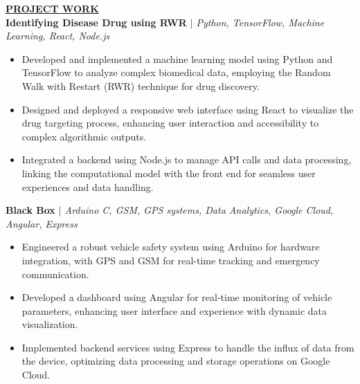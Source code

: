 \documentclass{article}
\begin{document}
\vspace{2mm} 
\noindent \textbf{\underline{PROJECT WORK}}\\
\noindent \textbf{Identifying Disease Drug using RWR} \textit{$\mid$ Python, TensorFlow, Machine Learning, React, Node.js} \hfill \textbf{}
\begin{itemize}[noitemsep,nolistsep,leftmargin=*]
\item {\small Developed and implemented a machine learning model using Python and TensorFlow to analyze complex biomedical data, employing the Random Walk with Restart (RWR) technique for drug discovery.}
\item {\small Designed and deployed a responsive web interface using React to visualize the drug targeting process, enhancing user interaction and accessibility to complex algorithmic outputs.}
\item {\small Integrated a backend using Node.js to manage API calls and data processing, linking the computational model with the front end for seamless user experiences and data handling.}
\end{itemize}

\noindent \textbf{Black Box} \textit{$\mid$ Arduino C, GSM, GPS systems, Data Analytics, Google Cloud, Angular, Express} \hfill \textbf{}
\begin{itemize}[noitemsep,nolistsep,leftmargin=*]
\item {\small Engineered a robust vehicle safety system using Arduino for hardware integration, with GPS and GSM for real-time tracking and emergency communication.}
\item {\small Developed a dashboard using Angular for real-time monitoring of vehicle parameters, enhancing user interface and experience with dynamic data visualization.}
\item {\small Implemented backend services using Express to handle the influx of data from the device, optimizing data processing and storage operations on Google Cloud.}
\end{itemize}
\end{document}
